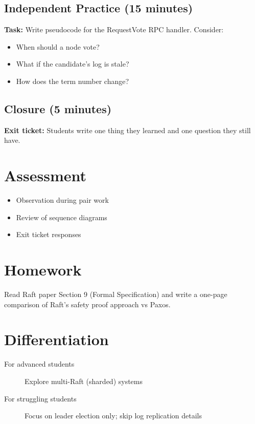 \documentclass[
    language=english,
    doctype=lesson-plan,
    institution=none,
]{../../omnilatex}
\begin{document}
\subsection{Independent Practice (15 minutes)}
\textbf{Task:} Write pseudocode for the RequestVote RPC handler.
Consider:
\begin{itemize}
    \item When should a node vote?
    \item What if the candidate's log is stale?
    \item How does the term number change?
\end{itemize}

\subsection{Closure (5 minutes)}
\textbf{Exit ticket:} Students write one thing they learned and one
question they still have.

\section*{Assessment}
\begin{itemize}
    \item Observation during pair work
    \item Review of sequence diagrams
    \item Exit ticket responses
\end{itemize}

\section*{Homework}
Read Raft paper Section 9 (Formal Specification) and write a
one-page comparison of Raft's safety proof approach vs Paxos.

\section*{Differentiation}
\begin{description}
    \item[For advanced students] Explore multi-Raft (sharded) systems
    \item[For struggling students] Focus on leader election only;
      skip log replication details
\end{description}
\end{document}
